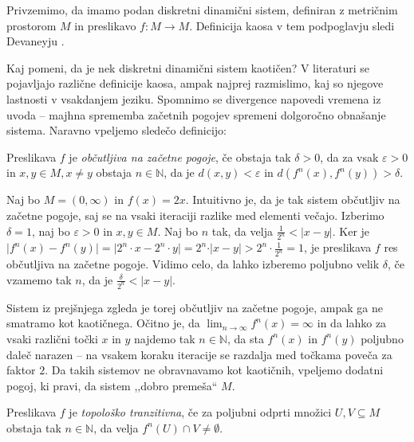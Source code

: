 \documentclass{isrmdelo}
\newcommand{\N}{\mathbb N}
\newcommand{\narekovaji}[1]{,,#1``}
\begin{document}
Privzemimo, da imamo podan diskretni dinamični sistem, definiran z metričnim prostorom $M$ in preslikavo $f: M \rightarrow M$. Definicija kaosa v tem podpoglavju sledi Devaneyju \cite{devaney}.

Kaj pomeni, da je nek diskretni dinamični sistem kaotičen? V literaturi se pojavljajo različne definicije kaosa, ampak najprej razmislimo, kaj so njegove lastnosti v vsakdanjem jeziku. Spomnimo se divergence napovedi vremena iz uvoda -- majhna sprememba začetnih pogojev spremeni dolgoročno obnašanje sistema. Naravno vpeljemo sledečo definicijo:

\begin{definicija}
Preslikava $f$ je \emph{občutljiva na začetne pogoje}, če obstaja tak $\delta > 0$, da za vsak $\varepsilon > 0$ in $x,y \in M, x \neq y$ obstaja $n \in \N$, da je $d(x, y) < \varepsilon$ in $d(f^{n}(x), f^{n}(y)) > \delta$.
\end{definicija}

\begin{zgled}
Naj bo $M = (0, \infty)$ in $f(x) = 2x$. Intuitivno je, da je tak sistem občutljiv na začetne pogoje, saj se na vsaki iteraciji razlike med elementi večajo. Izberimo $\delta = 1$, naj bo $\varepsilon > 0$ in $x,y \in M$. Naj bo $n$ tak, da velja $\frac{1}{2^n} < \vert x-y \vert$. Ker je $\vert f^{n}(x) - f^{n}(y) \vert = \vert 2^n \cdot x - 2^n \cdot y \vert = 2^n \cdot \vert x-y \vert > 2^n \cdot \frac{1}{2^n} = 1$, je preslikava $f$ res občutljiva na začetne pogoje. Vidimo celo, da lahko izberemo poljubno velik $\delta$, če vzamemo tak $n$, da je $\frac{\delta}{2^n} < \vert x-y \vert.$
\end{zgled}

\bigskip

Sistem iz prejšnjega zgleda je torej občutljiv na začetne pogoje, ampak ga ne smatramo kot kaotičnega. Očitno je, da $\lim_{n \rightarrow \infty}f^{n}(x) = \infty$ in da lahko za vsaki različni točki $x$ in $y$ najdemo tak $n \in \N$, da sta $f^{n}(x)$ in $f^{n}(y)$ poljubno daleč narazen -- na vsakem koraku iteracije se razdalja med točkama poveča za faktor $2$. Da takih sistemov ne obravnavamo kot kaotičnih, vpeljemo dodatni pogoj, ki pravi, da sistem \narekovaji{dobro premeša} $M$.

\begin{definicija}
Preslikava $f$ je \emph{topološko tranzitivna}, če za poljubni odprti množici $U, V \subseteq M$ obstaja tak $n \in \N$, da velja $f^{n}(U) \cap V \neq \emptyset$.
\end{definicija}
\end{document}
